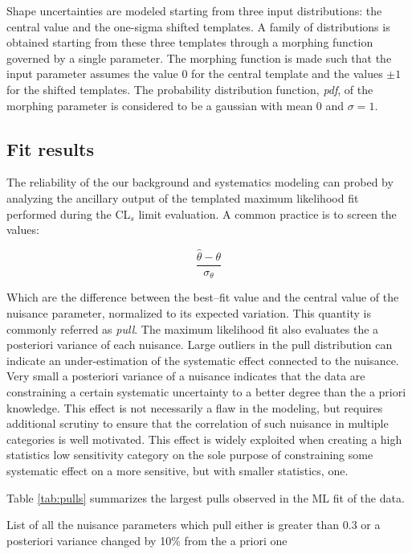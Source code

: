 Shape uncertainties are modeled starting from three input distributions: the central value and the one-sigma shifted templates. A family of distributions is obtained starting from these three templates through a morphing function governed by a single parameter. The morphing function is made such that the input parameter assumes the value 0 for the central template and the values $\pm1$ for the shifted templates. The probability distribution function, \emph{pdf}, of the morphing parameter is considered to be a gaussian with mean 0 and $\sigma = 1$.

\subsection{Fit results}

The reliability of the our background and systematics modeling can probed by analyzing the ancillary output of the templated maximum likelihood fit performed during the CL$_s$ limit evaluation. A common practice is to screen the values:

\begin{equation}
\dfrac{\hat{\theta} - \theta}{\sigma_{\theta}}
\end{equation}

Which are the difference between the best--fit value and the central value of the nuisance parameter, normalized to its expected variation. This quantity is commonly referred as \emph{pull}. The maximum likelihood fit also evaluates the a posteriori variance of each nuisance. Large outliers in the pull distribution can indicate an under-estimation of the systematic effect connected to the nuisance. Very small a posteriori variance of a nuisance indicates that the data are constraining a certain systematic uncertainty to a better degree than the a priori knowledge. This effect is not necessarily a flaw in the modeling, but requires additional scrutiny to ensure that the correlation of such nuisance in multiple categories is well motivated. This effect is widely exploited when creating a high statistics low sensitivity category on the sole purpose of constraining some systematic effect on a more sensitive, but with smaller statistics, one. 

Table \ref{tab:pulls} summarizes the largest pulls observed in the ML fit of the data.

\begin{table}

\caption{List of all the nuisance parameters which pull either is greater than 0.3 or a posteriori variance changed by 10\% from the a priori one}
\label{tab:pulls}
\end{table}

